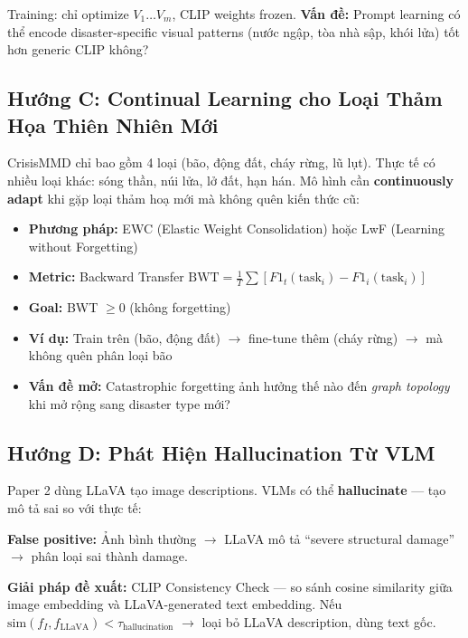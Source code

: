 \documentclass[12pt,a4paper]{article}
\begin{document}
Training: chỉ optimize $V_1 \ldots V_m$, CLIP weights frozen. \textbf{Vấn đề:} Prompt learning có thể encode disaster-specific visual patterns (nước ngập, tòa nhà sập, khói lửa) tốt hơn generic CLIP không?

\subsection{Hướng C: Continual Learning cho Loại Thảm Họa Thiên Nhiên Mới}

CrisisMMD chỉ bao gồm 4 loại (bão, động đất, cháy rừng, lũ lụt). Thực tế có nhiều loại khác: sóng thần, núi lửa, lở đất, hạn hán. Mô hình cần \textbf{continuously adapt} khi gặp loại thảm hoạ mới mà không quên kiến thức cũ:

\begin{itemize}
  \item \textbf{Phương pháp:} EWC (Elastic Weight Consolidation) hoặc LwF (Learning without Forgetting)
  \item \textbf{Metric:} Backward Transfer $\text{BWT} = \frac{1}{T} \sum [F1_t(\text{task}_i) - F1_i(\text{task}_i)]$
  \item \textbf{Goal:} BWT $\geq 0$ (không forgetting)
  \item \textbf{Ví dụ:} Train trên (bão, động đất) $\rightarrow$ fine-tune thêm (cháy rừng) $\rightarrow$ mà không quên phân loại bão
  \item \textbf{Vấn đề mở:} Catastrophic forgetting ảnh hưởng thế nào đến \textit{graph topology} khi mở rộng sang disaster type mới?
\end{itemize}

\subsection{Hướng D: Phát Hiện Hallucination Từ VLM}

Paper 2 dùng LLaVA tạo image descriptions. VLMs có thể \textbf{hallucinate} — tạo mô tả sai so với thực tế:

\begin{warningbox}
\textbf{False positive:} Ảnh bình thường $\rightarrow$ LLaVA mô tả ``severe structural damage'' $\rightarrow$ phân loại sai thành damage.

\textbf{Giải pháp đề xuất:} CLIP Consistency Check — so sánh cosine similarity giữa image embedding và LLaVA-generated text embedding. Nếu $\text{sim}(f_I, f_{\text{LLaVA}}) < \tau_{\text{hallucination}}$ $\rightarrow$ loại bỏ LLaVA description, dùng text gốc.
\end{warningbox}
\end{document}
